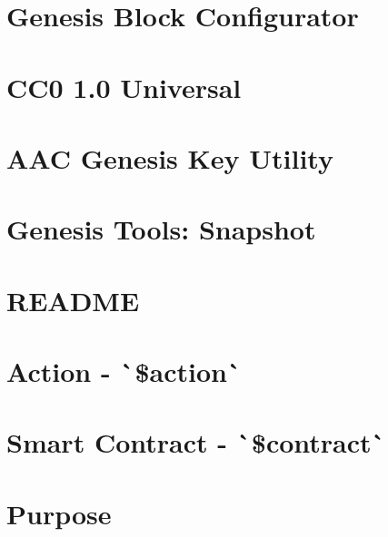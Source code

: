 \documentclass[twoside]{book}
\newcommand{\+}{\discretionary{\mbox{\scriptsize$\hookleftarrow$}}{}{}}
\begin{document}
\chapter{Genesis Block Configurator}
\label{md_programs_snapshot_tools_genesis_readme}

\chapter{C\+C0 1.0 Universal}
\label{md_programs_snapshot_tools_keys__l_i_c_e_n_s_e}

\chapter{A\+AC Genesis Key Utility}
\label{md_programs_snapshot_tools_keys_readme}

\chapter{Genesis Tools\+: Snapshot}
\label{md_programs_snapshot_tools_snapshot_readme}

\chapter{R\+E\+A\+D\+ME}
\label{md__r_e_a_d_m_e}

\chapter{Action -\/ \`{}\$action\`{}}
\label{md_scripts_abi_to_rc_rc-action-template}

\chapter{Smart Contract -\/ \`{}\$contract\`{}}
\label{md_scripts_abi_to_rc_rc-overview-template}

\chapter{Purpose}
\label{md_scripts_abi_to_rc__r_e_a_d_m_e}

\end{document}
